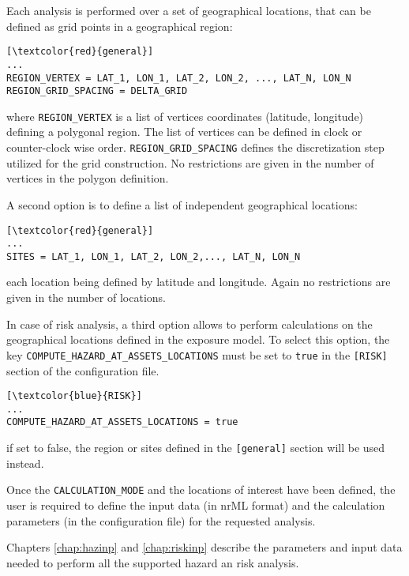 Each analysis is performed over a set of geographical locations, that can be defined as grid points in a geographical region:

\begin{Verbatim}[frame=single, commandchars=\\\{\}, samepage=true]
[\textcolor{red}{general}]
...
REGION_VERTEX = LAT_1, LON_1, LAT_2, LON_2, ..., LAT_N, LON_N
REGION_GRID_SPACING = DELTA_GRID
\end{Verbatim}

where \Verb+REGION_VERTEX+ is a list of vertices coordinates (latitude, longitude) defining a polygonal region. The list of vertices can be defined in clock or counter-clock wise order. \Verb+REGION_GRID_SPACING+ defines the discretization step utilized for the grid construction. No restrictions are given in the number of vertices in the polygon definition.

A second option is to define a list of independent geographical locations:
\begin{Verbatim}[frame=single, commandchars=\\\{\}, samepage=true]
[\textcolor{red}{general}]
...
SITES = LAT_1, LON_1, LAT_2, LON_2,..., LAT_N, LON_N
\end{Verbatim}
each location being defined by latitude and longitude. Again no restrictions are given in the number of locations.

In case of risk analysis, a third option allows to perform calculations on the geographical locations defined in the exposure model. To select this option, the key \Verb+COMPUTE_HAZARD_AT_ASSETS_LOCATIONS+ must be set to \Verb+true+ in the \Verb+[RISK]+ section of the configuration file.
\begin{Verbatim}[frame=single, commandchars=\\\{\}, samepage=true]
[\textcolor{blue}{RISK}]
...
COMPUTE_HAZARD_AT_ASSETS_LOCATIONS = true
\end{Verbatim}
if set to false, the region or sites defined in the \Verb+[general]+ section will be used instead.

Once the \Verb+CALCULATION_MODE+ and the locations of interest have been defined, the user is required to define the input data (in nrML format) and the calculation parameters (in the configuration file) for the requested analysis.

Chapters \ref{chap:hazinp} and \ref{chap:riskinp} describe the parameters and input data needed to perform all the supported hazard an risk analysis.